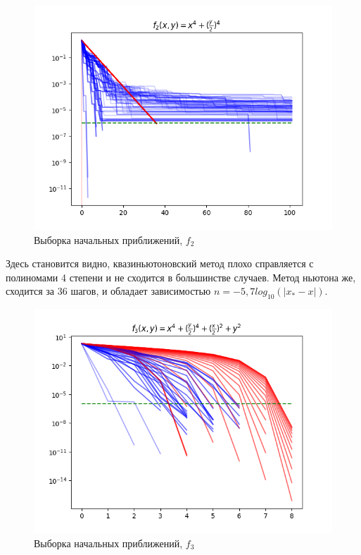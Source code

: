 \begin{figure}[H]
			\centering
			\includegraphics[scale=0.75]{figures/init_100_func2}
			\caption{Выборка начальных приближений, $f_2$}
			\label{fig:init_100_func2}
\end{figure}

Здесь становится видно, квазиньютоновский метод плохо справляется с полиномами 4 степени и не сходится в большинстве случаев.
Метод ньютона же, сходится за 36 шагов, и обладает зависимостью $n = -5,7 log_10(|x_*-x|)$.

\begin{figure}[H]
			\centering
			\includegraphics[scale=0.75]{figures/init_100_func3}
			\caption{Выборка начальных приближений, $f_3$}
			\label{fig:init_100_func3}
\end{figure}

